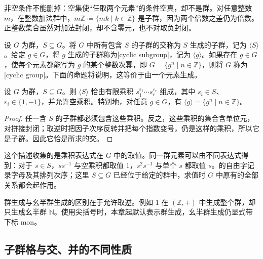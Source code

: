 非空条件不能删掉：空集使“任取两个元素”的条件空真，却不是群。对任意整数 \(m\)，在整数加法群中，\(m\mathbb Z\coloneqq\{mk\mid k\in\mathbb Z\}\) 是子群，因为两个倍数之差仍为倍数。正整数集合虽然对加法封闭，却不含零元，也不对取负封闭。

\begin{definition}\label{b1:def:generated-subgroup}
	设 \(G\) 为群，\(S\subseteq G\)。将 \(G\) 中所有包含 \(S\) 的子群的交称为 \(S\) 生成的子群，记为 \(\langle S\rangle\)。给定 \(g\in G\)，将 \(g\) 生成的子群称为[cyclic subgroup]，记为 \(\langle g\rangle\)。如果存在 \(g\in G\)，使每个元素都能写为 \(g\) 的某个整数次幂，即 \(G=\{g^n\mid n\in\mathbb Z\}\)，则将 \(G\) 称为[cyclic group]。下面的命题将说明，这等价于由一个元素生成。
\end{definition}


\begin{proposition}\label{b1:prop:generated-subgroup-words}
	设 \(G\) 为群，\(S\subseteq G\)。则 \(\langle S\rangle\) 恰由有限乘积 \(s_1^{\varepsilon_1}\cdots s_r^{\varepsilon_r}\) 组成，其中 \(s_i\in S\)、\(\varepsilon_i\in\{1,-1\}\)，并允许空乘积。特别地，对任意 \(g\in G\)，有 \(\langle g\rangle=\{g^n\mid n\in\mathbb Z\}\)。
\end{proposition}

\begin{proof}
	任一含 \(S\) 的子群都必须包含这些乘积。反之，这些乘积的集合含单位元，对拼接封闭；取逆时把因子次序反转并把每个指数变号，仍是这样的乘积，所以它是子群。因此它恰是所求的交。
\end{proof}

这个描述收集的是乘积表达式在 \(G\) 中的取值。同一群元素可以由不同表达式得到：对于 \(s\in S\)，\(ss^{-1}\) 与空乘积都取值 \(1\)，\(s^2s^{-1}\) 与单个 \(s\) 都取值 \(s\)。的自由字记录字母及其排列次序；这里 \(S\subseteq G\) 已经位于给定的群中，求值时 \(G\) 中原有的全部关系都会起作用。

\ProseParagraphBreak
群生成与幺半群生成的区别在于允许取逆。例如 \(1\) 在 \((\mathbb Z,+)\) 中生成整个群，却只生成幺半群 \(\mathbb N\)。使用尖括号时，本章起默认表示群生成，幺半群生成仍显式带下标 \(\mathrm{mon}\)。

\subsection{子群格与交、并的不同性质}
\label{b1:subsec:0201:03}

